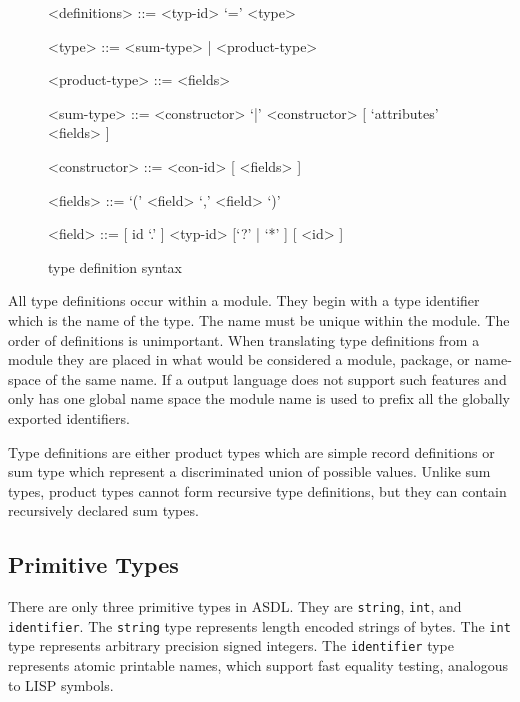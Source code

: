 \begin{figure}[ht]
  \begin{center}
    \begin{grammar}
      <definitions>  ::= { <typ-id> `=' <type> }

      <type>         ::= <sum-type> | <product-type>

      <product-type> ::= <fields>

      <sum-type>     ::= <constructor> { `|' <constructor> } [ `attributes' <fields> ]

      <constructor>  ::= <con-id> [ <fields> ]

      <fields>       ::= `(' { <field>  `,' } <field> `)'

      <field>        ::= [ id `.' ] <typ-id> [`?' | `*' ]  [ <id> ]
    \end{grammar}
  \end{center}
  \caption{\asdl{} type definition syntax}
\end{figure}%

All type definitions occur within a module.  They begin with a type
identifier which is the name of the type. The name must be unique within the
module. The order of definitions is unimportant. When translating type
definitions from a module they are placed in what would be considered a
module, package, or name-space of the same name. If a output language does
not support such features and only has one global name space the module name
is used to prefix all the globally exported identifiers.

Type definitions are either product types which are simple record definitions
or sum type which represent a discriminated union of possible values. Unlike
sum types, product types cannot form recursive type definitions, but they can
contain recursively declared sum types.

\subsection{Primitive Types}
There are only three primitive types in ASDL. They
are \lstinline[language=ASDL]!string!, \lstinline[language=ASDL]!int!, and \lstinline[language=ASDL]!identifier!. The \lstinline[language=ASDL]!string! type
represents length encoded strings of bytes. The \lstinline[language=ASDL]!int! type represents
arbitrary precision signed integers. The \lstinline[language=ASDL]!identifier! type represents
atomic printable names, which support fast equality testing, analogous to
LISP symbols.


